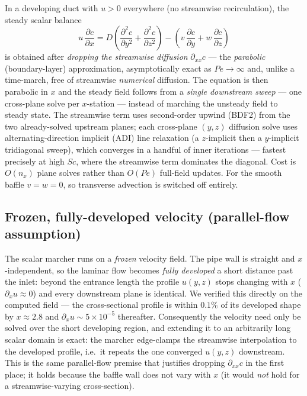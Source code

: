 \documentclass[11pt]{article}
\newcommand{\Sc}{\mathit{Sc}}
\newcommand{\Pe}{\mathit{Pe}}
\begin{document}
In a developing duct with $u > 0$ everywhere (no streamwise
recirculation), the steady scalar balance
\begin{equation}
  u\,\frac{\partial c}{\partial x}
   = D\!\left(\frac{\partial^2 c}{\partial y^2}
            + \frac{\partial^2 c}{\partial z^2}\right)
   - \left(v\,\frac{\partial c}{\partial y}
         + w\,\frac{\partial c}{\partial z}\right)
\end{equation}
is obtained after \emph{dropping the streamwise diffusion}
$\partial_{xx}c$ --- the \emph{parabolic} (boundary-layer) approximation,
asymptotically exact as $\Pe \to \infty$ and, unlike a time-march, free
of streamwise \emph{numerical} diffusion. The equation is then parabolic
in $x$ and the steady field follows from a \emph{single downstream sweep}
--- one cross-plane solve per $x$-station --- instead of marching the
unsteady field to steady state. The streamwise term uses second-order
upwind (BDF2) from the two already-solved upstream planes; each
cross-plane $(y,z)$ diffusion solve uses alternating-direction implicit
(ADI) line relaxation (a $z$-implicit then a $y$-implicit tridiagonal
sweep), which converges in a handful of inner iterations --- fastest
precisely at high $\Sc$, where the streamwise term dominates the
diagonal. Cost is $O(n_x)$ plane solves rather than $O(\Pe)$ full-field
updates. For the smooth baffle $v = w = 0$, so transverse advection is
switched off entirely.

\subsection{Frozen, fully-developed velocity (parallel-flow assumption)}

The scalar marcher runs on a \emph{frozen} velocity field. The pipe wall
is straight and $x$-independent, so the laminar flow becomes
\emph{fully developed} a short distance past the inlet: beyond the
entrance length the profile $u(y,z)$ stops changing with $x$
($\partial_x u \approx 0$) and every downstream plane is identical. We
verified this directly on the computed field --- the cross-sectional
profile is within $0.1\%$ of its developed shape by $x \approx 2.8$ and
$\partial_x u \sim 5\times10^{-5}$ thereafter. Consequently the velocity
need only be solved over the short developing region, and extending it to
an arbitrarily long scalar domain is exact: the marcher edge-clamps the
streamwise interpolation to the developed profile, i.e.\ it repeats the
one converged $u(y,z)$ downstream. This is the same parallel-flow premise
that justifies dropping $\partial_{xx}c$ in the first place; it holds
because the baffle wall does not vary with $x$ (it would \emph{not} hold
for a streamwise-varying cross-section).
\end{document}
